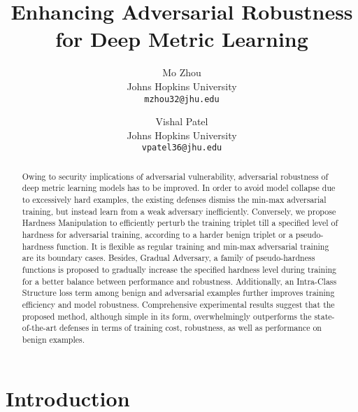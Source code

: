 \documentclass[10pt,twocolumn,letterpaper]{article}
\begin{document}
\title{Enhancing Adversarial Robustness for Deep Metric Learning}

\author{Mo Zhou\\
Johns Hopkins University\\
{\tt\small mzhou32@jhu.edu}
\and
Vishal Patel\\
Johns Hopkins University\\
{\tt\small vpatel36@jhu.edu}
}
\maketitle

\begin{abstract}
	Owing to security implications of adversarial vulnerability, adversarial
	robustness of deep metric learning models has to be improved.
	In order to avoid model collapse due to excessively hard examples, the
	existing defenses dismiss the min-max adversarial training, but instead
	learn from a weak adversary inefficiently.
	Conversely, we propose Hardness Manipulation to efficiently perturb the
	training triplet till a specified level of hardness for adversarial
	training, according to a harder benign triplet or a pseudo-hardness
	function.
	It is flexible as regular training and min-max adversarial training
	are its boundary cases.
	Besides, Gradual Adversary, a family of pseudo-hardness functions is
	proposed to gradually increase the specified hardness level during training
	for a better balance between performance and robustness.
	Additionally, an Intra-Class Structure loss term among benign and adversarial
	examples further improves training efficiency and model robustness.
	Comprehensive experimental results suggest that the proposed method,
	although simple in its form, overwhelmingly outperforms the
	state-of-the-art defenses in terms of training cost,
	robustness, as well as performance on benign examples.
%
\end{abstract}

\section{Introduction}
\label{sec:1}
\end{document}
